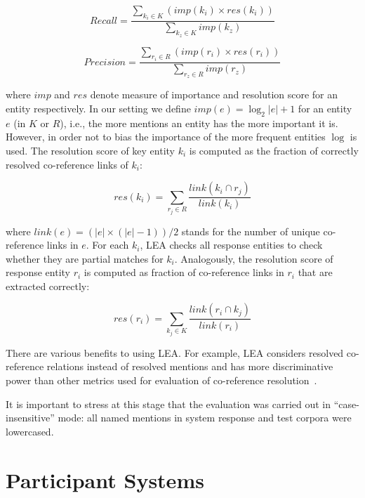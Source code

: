\documentclass[11pt]{article}
\begin{document}
\begin{equation*}
	\mathit{Recall} = \frac{\sum_{k_{i} \in K} (\mathit{imp}(k_i) \times \mathit{res}(k_{i}))}
              {\sum_{k_{z} \in K} imp(k_{z})}
\end{equation*}

\begin{equation*}
	\mathit{Precision} = \frac{\sum_{r_{i} \in R} (\mathit{imp}(r_i) \times \mathit{res}(r_{i}))}
              {\sum_{r_{z} \in R} imp(r_{z})}
\end{equation*}

\noindent where $\mathit{imp}$ and $\mathit{res}$ denote measure of importance and resolution score for an entity respectively.
In our setting we define $\mathit{imp}(e) = \log_{2}|e|+1$ for an entity $e$ (in $K$ or $R$), i.e., the more mentions 
an entity has the more important it is. However, in order not to bias the importance of the more frequent entities $\log$ 
is used. The resolution score of key entity $k_i$ is computed as the fraction of correctly resolved co-reference 
links of $k_i$: 

\begin{equation*}
	\mathit{res}(k_i) = \sum_{r_{j} \in R} \frac{\mathit{link}(k_{i} \cap r_{j})}{\mathit{link}(k_{i})}
\end{equation*}

\noindent where $\mathit{link}(e) = (|e| \times (|e|-1))/2$ stands for the number of unique 
co-reference links in $e$. For each $k_i$, LEA checks all response entities to check whether 
they are partial matches for $k_i$. Analogously, the resolution score of response entity $r_i$ is
computed as fraction of co-reference links in $r_i$ that are extracted correctly:

\begin{equation*}
	\mathit{res}(r_i) = \sum_{k_{j} \in K} \frac{\mathit{link}(r_{i} \cap k_{j})}{\mathit{link}(r_{i})}
\end{equation*}

There are various benefits to using LEA.  For example, LEA considers
resolved co-reference relations instead of resolved mentions and has more
discriminative power than other metrics used for evaluation of
co-reference resolution~\cite{DBLP:conf-acl-Moosavi016}.

It is important to stress at this stage that the evaluation was carried
out in ``case-insensitive'' mode: all named mentions in system response
and test corpora were lowercased.


\section{Participant Systems}
\label{sec:participants}
 
\end{document}
